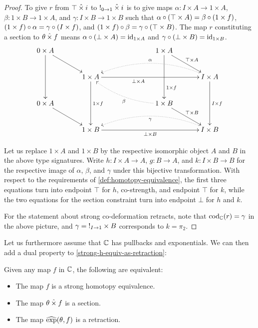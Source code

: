 \documentclass[reqno,10pt,a4paper,oneside]{amsart}
\begin{document}
\begin{proof}
To give $r$ from $\top \mathbin{\hat{\times}} i$ to $\mathord{!}_{0 \to 1} \mathbin{\hat{\times}} i$ is to give maps $\alpha : I \times A \to 1 \times A$, $\beta : 1 \times B \to 1 \times A$, and $\gamma : I \times B \to 1 \times B$ such that $\alpha \mathbin{\circ} (\top \times A) = \beta \mathbin{\circ} (1 \times f)$, $(1 \times f) \mathbin{\circ} \alpha = \gamma \mathbin{\circ} (I \times f)$, and $(1 \times f) \mathbin{\circ} \beta = \gamma \mathbin{\circ} (\top \times B)$.
The map $r$ constituting a section to $\theta \mathbin{\hat{\times}} f$ means $\alpha \mathbin{\circ} (\bot \times A) = \operatorname{id}_{1 \times A}$ and $\gamma \mathbin{\circ} (\bot \times B) = \operatorname{id}_{1 \times B}$.
\[
\xymatrix@C+1em{
  0 \times A
  \ar[dr]
  \ar[dd]
&&&
  1 \times A
  \ar[dr]^{\top \times A}
  \ar[dd]^(0.7){1 \times f}
\\&
  1 \times A
  \ar[dd]^{1 \times f}
  \ar[rrr]_(0.4){\bot \times A}
&&&
  I \times A
  \ar[dd]^{I \times f}
  \ar@{.>}@/_2em/[lll]_{\alpha}
\\
  0 \times A
  \ar[dr]
&&&
  1 \times B
  \ar[dr]^{\top \times B}
  \ar@{.>}@/^1em/[llu]^{\beta}
\\&
  1 \times B
  \ar[rrr]_{\bot \times B}
&&&
  I \times B
  \ar@{.>}@/_2em/[lll]^{\gamma}
}
\]

Let us replace $1 \times A$ and $1 \times B$ by the respective isomorphic object $A$ and $B$ in the above type signatures.
Write $h : I \times A \to A$, $g : B \to A$, and $k : I \times B \to B$ for the respective image of $\alpha$, $\beta$, and $\gamma$ under this bijective transformation.
With respect to the requirements of \cref{def:homotopy-equivalence}, the first three equations turn into endpoint $\top$ for $h$, co-strength, and endpoint $\top$ for $k$, while the two equations for the section constraint turn into endpoint $\bot$ for $h$ and $k$.

For the statement about strong co-deformation retracts, note that $\operatorname{cod}_{\mathbb{C}}(r) = \gamma$ in the above picture, and $\gamma = \mathord{!}_{I \to 1} \times B$ corresponds to $k = \pi_2$.
\end{proof}

Let us furthermore assume that $\mathbb{C}$ has pullbacks and exponentials.
We can then add a dual property to \cref{strong-h-equiv-as-retraction}:

\begin{corollary}
\label{strong-h-equiv-slick}
Given any map $f$ in $\mathbb{C}$, the following are equivalent:
\begin{itemize}
\item The map $f$ is a strong homotopy equivalence.
\item The map $\theta \mathbin{\hat{\times}} f$ is a section.
\item The map $\operatorname{\widehat{exp}}(\theta, f)$ is a retraction.
\end{itemize}
\end{corollary}
\end{document}

